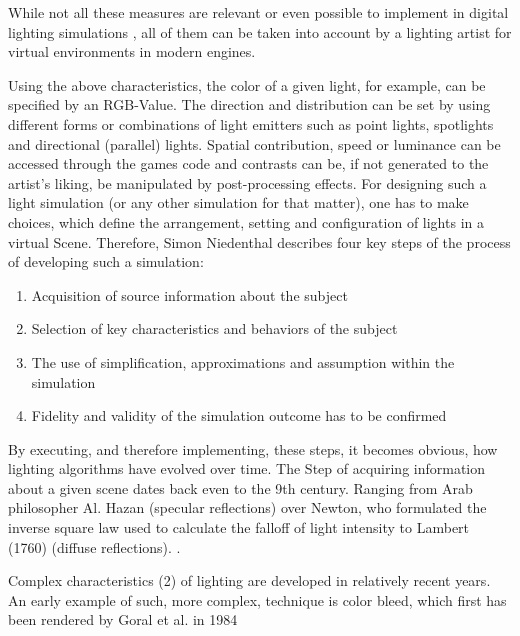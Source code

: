 While not all these measures are relevant or even possible to implement in digital lighting simulations \cite{Niedenthal1404353}, all of them can be taken into account by a lighting artist for virtual environments in modern engines. 

Using the above characteristics, the color of a given light, for example, can be specified by an RGB-Value. The direction and distribution can be set by using different forms or combinations of light emitters such as point lights, spotlights and directional (parallel) lights. Spatial contribution, speed or luminance can be accessed through the games code and contrasts can be, if not generated to the artist's liking, be manipulated by post-processing effects. 
\newpage
For designing such a light simulation (or any other simulation for that matter), one has to make choices, which define the arrangement, setting and configuration of lights in a virtual Scene. Therefore, Simon Niedenthal describes four key steps of the process of developing such a simulation\cite{Niedenthal1404353}: 

\begin{enumerate}
    \item Acquisition of source information about the subject
    \item Selection of key characteristics and behaviors of the subject
    \item The use of simplification, approximations and assumption within the simulation
    \item Fidelity and validity of the simulation outcome has to be confirmed
\end{enumerate}

By executing, and therefore implementing, these steps, it becomes obvious, how lighting algorithms have evolved over time. The Step of acquiring information about a given scene dates back even to the 9th century. Ranging from Arab philosopher Al. Hazan (specular reflections) over Newton, who formulated the inverse square law used to calculate the falloff of light intensity to Lambert (1760) (diffuse reflections). \cite{Niedenthal1404353}. 

Complex characteristics (2) of lighting are developed in relatively recent years. An early example of such, more complex, technique is  color bleed, which first has been rendered by Goral et al. in 1984 \cite{Goral84} 

